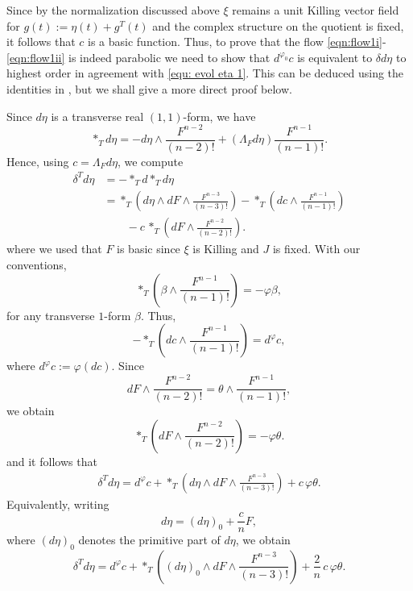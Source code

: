 \documentclass{article}
\theoremstyle{definition}
\renewcommand{\phi}{\varphi}
\numberwithin{equation}{section}
\begin{document}
Since by the normalization discussed above $\xi$ remains a unit Killing vector field for $g(t):=\eta(t) +g^T(t)$ and the complex structure on the quotient is fixed, it follows that $c$ is a basic function. Thus, to prove that the flow \eqref{eqn:flow1i}-\eqref{eqn:flow1ii} is indeed parabolic we need to show that $d^{\varphi_0} c$ is equivalent to $\delta d \eta$ to highest order in agreement with \eqref{equ: evol eta 1}. This can be deduced using the identities in \cite[Theorem 1.1]{Demailly}, but we shall give a more direct proof below.

Since $d\eta$ is a transverse real $(1,1)$-form, we have
\[
*_Td\eta
=
-d\eta\wedge\frac{F^{n-2}}{(n-2)!}
+
(\Lambda_Fd\eta)\frac{F^{n-1}}{(n-1)!}.
\]
Hence, using $c=\Lambda_Fd\eta$, we compute
\[
\begin{aligned}
\delta^Td\eta
&=-*_Td*_Td\eta\\
&=
*_T\left(
d\eta\wedge dF\wedge
\frac{F^{n-3}}{(n-3)!}
\right)
-
*_T\left(
dc\wedge
\frac{F^{n-1}}{(n-1)!}
\right)\\
&\qquad
-
c\,
*_T\left(
dF\wedge
\frac{F^{n-2}}{(n-2)!}
\right).
\end{aligned}
\]
where we used that $F$ is basic since $\xi$ is Killing and $J$ is fixed. With our conventions,
\[
*_T\left(
\beta\wedge
\frac{F^{n-1}}{(n-1)!}
\right)
=
-\phi\beta ,
\]
for any transverse $1$-form $\beta$. Thus,
\[
-*_T\left(
dc\wedge
\frac{F^{n-1}}{(n-1)!}
\right)
=
d^\phi c ,
\]
where $
d^\phi c:=\phi(dc).$ 
Since 
\[
dF\wedge
\frac{F^{n-2}}{(n-2)!}
=
\theta\wedge
\frac{F^{n-1}}{(n-1)!},
\]
we obtain
\[
*_T\left(
dF\wedge
\frac{F^{n-2}}{(n-2)!}
\right)
=
-\phi\theta.
\]
and it follows that
\[
\begin{aligned}
\delta^Td\eta
=
d^\phi c
+
*_T\left(
d\eta\wedge dF\wedge
\frac{F^{n-3}}{(n-3)!}
\right)
+
c\,\phi\theta .
\end{aligned}
\]
Equivalently, writing
\[
d\eta=(d\eta)_0+\frac{c}{n}F,
\]
where $(d\eta)_0$ denotes the primitive part of $d\eta$, we obtain
\begin{equation}\label{eq:codifferential-deta}
\delta^Td\eta
=
d^\phi c
+
*_T\left(
(d\eta)_0\wedge dF\wedge
\frac{F^{n-3}}{(n-3)!}
\right)
+
\frac{2}{n}\,c\,\phi\theta .
\end{equation}
\end{document}
